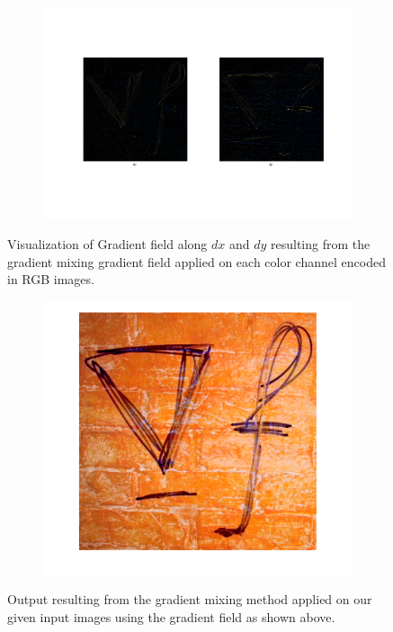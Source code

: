 \documentclass{paper}
\begin{document}
\begin{figure}[H]
    \centering
    \begin{subfigure}{1.0\textwidth}
        \includegraphics[width=\textwidth]{../../outputs/p4/gradient_mixing/gradients}
    \end{subfigure}
    \caption{Visualization of Gradient field along $dx$ and $dy$ resulting from the gradient mixing gradient field applied on each color channel encoded in RGB images.}
    \label{fig:gradient_mixing_gradients}       
\end{figure}


\begin{figure}[H]
    \centering
    \begin{subfigure}{1.0\textwidth}
        \includegraphics[width=\textwidth]{../../outputs/p4/gradient_mixing/output}
    \end{subfigure}
    \caption{Output resulting from the gradient mixing method applied on our given input images using the gradient field as shown above.}
    \label{fig:gradient_mixing_out}       
\end{figure}
\end{document}

